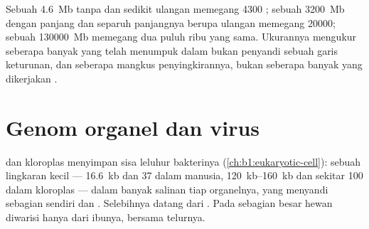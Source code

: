 \begin{example}\label{ex:b1:genomes:sizes}
Sebuah  \qty{4.6}{Mb} tanpa  dan sedikit ulangan memegang
\num{4300} ; sebuah  \qty{3200}{Mb} dengan  panjang dan
separuh panjangnya berupa ulangan memegang \num{20000}; sebuah 
\qty{130000}{Mb} memegang dua puluh ribu yang sama. Ukurannya mengukur
seberapa banyak yang telah menumpuk dalam  bukan penyandi sebuah
garis keturunan, dan seberapa mangkus penyingkirannya, bukan seberapa
banyak yang dikerjakan .
\end{example}

\section{Genom organel dan virus}

\begin{definition}\label{def:b1:genomes:organelle}
 dan kloroplas menyimpan sisa  leluhur bakterinya
(\cref{ch:b1:eukaryotic-cell}): sebuah lingkaran kecil ---
\qty{16.6}{kb} dan 37  dalam  manusia,
\qtyrange{120}{160}{kb} dan sekitar 100  dalam kloroplas --- dalam
banyak salinan tiap organelnya, yang menyandi sebagian 
sendiri dan . Selebihnya  datang dari 
. Pada sebagian besar hewan   diwarisi hanya
dari ibunya, bersama   telurnya.
\end{definition}


